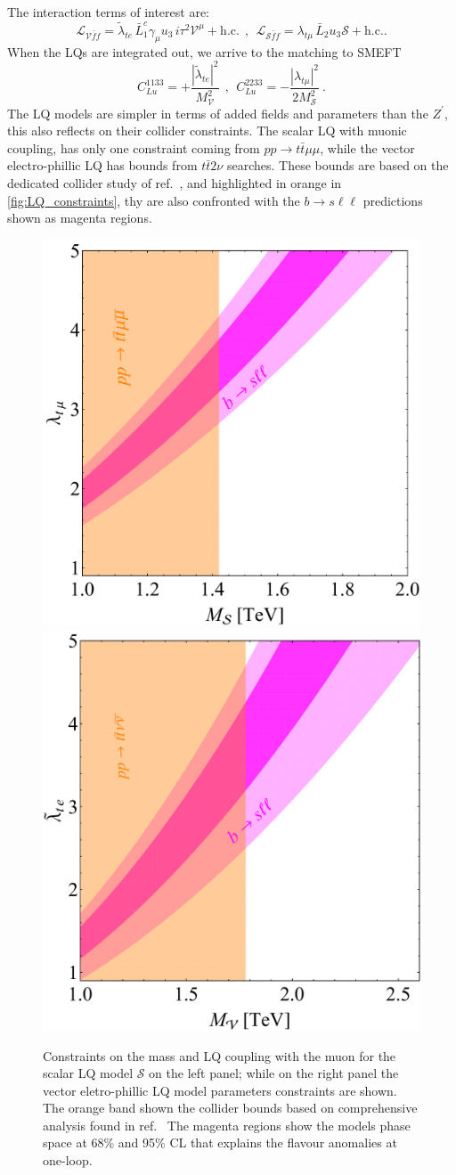 The interaction terms of interest are:
\begin{equation}
	\mathcal{L}_{\mathcal V \bar f f} =  \tilde \lambda_{t e}  \, \bar L^c_1\gamma_\mu u_{3} \, i \tau^2 \mathcal V^\mu  + \mathrm{h.c.} 
	\ \ , \ \
	\mathcal{L}_{\mathcal S \bar f f} =  \lambda_{t \mu} \,  \bar L_2 u_{3} \mathcal{S}  + \mathrm{h.c.}.
\end{equation}
When the LQs are integrated out, we arrive to the matching to SMEFT
\begin{equation}
	C_{Lu}^{1133} = +\frac{| \tilde \lambda_{t e}|^2}{M_{\mathcal V} ^2 }  
	\ \ , \ \ C_{Lu}^{2233} = -\frac{|  \lambda_{t \mu}|^2}{2 M_{\mathcal S}^2 } \ .
\end{equation}
The LQ models are simpler in terms of added fields and parameters than the $Z^\prime$, this also reflects on their collider constraints. The scalar LQ with muonic coupling, has only one constraint coming from $pp \to t \bar t \mu \mu$, while the vector electro-phillic LQ has bounds from $t \bar t 2 \nu$ searches. These bounds are based on the dedicated collider study of ref.~\cite{Angelescu:2018tyl}, and highlighted in orange in \autoref{fig:LQ_constraints}, thy are also confronted with the $b \to s \ell \ell$ predictions shown as magenta regions.
\begin{figure}[htpb!]
	\centering 
	\includegraphics[width=0.45\linewidth]{figures/Scalar_LQ.pdf}
	\includegraphics[width=0.435\linewidth]{figures/Vector_LQ.pdf}
	\caption{Constraints on the mass and LQ coupling with the muon for the scalar LQ model $\mathcal S$ on the left panel; while on the right panel the vector eletro-phillic LQ model parameters constraints are shown. The orange band shown the collider bounds based on comprehensive analysis found in ref.~\cite{Angelescu:2018tyl} The magenta regions show the models phase space at 68\% and 95\% CL that explains the flavour anomalies at one-loop.}    
	\label{fig:LQ_constraints}
\end{figure}
